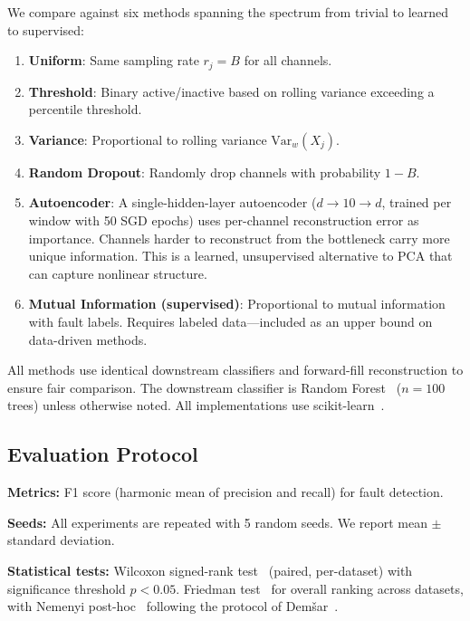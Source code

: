\documentclass[journal]{IEEEtran}
\begin{document}
We compare against six methods spanning the spectrum from trivial to learned to supervised:

\begin{enumerate}[leftmargin=*]
\item \textbf{Uniform}: Same sampling rate $r_j = B$ for all channels.
\item \textbf{Threshold}: Binary active/inactive based on rolling variance exceeding a percentile threshold.
\item \textbf{Variance}: Proportional to rolling variance $\text{Var}_w(X_j)$.
\item \textbf{Random Dropout}: Randomly drop channels with probability $1-B$.
\item \textbf{Autoencoder}: A single-hidden-layer autoencoder ($d \to 10 \to d$, trained per window with 50 SGD epochs) uses per-channel reconstruction error as importance. Channels harder to reconstruct from the bottleneck carry more unique information. This is a learned, unsupervised alternative to PCA that can capture nonlinear structure.
\item \textbf{Mutual Information (supervised)}: Proportional to mutual information with fault labels. Requires labeled data---included as an upper bound on data-driven methods.
\end{enumerate}

All methods use identical downstream classifiers and forward-fill reconstruction to ensure fair comparison. The downstream classifier is Random Forest~\cite{breiman2001random} ($n=100$ trees) unless otherwise noted. All implementations use scikit-learn~\cite{pedregosa2011scikit}.

\subsection{Evaluation Protocol}

\textbf{Metrics:} F1 score (harmonic mean of precision and recall) for fault detection.

\textbf{Seeds:} All experiments are repeated with 5 random seeds. We report mean $\pm$ standard deviation.

\textbf{Statistical tests:} Wilcoxon signed-rank test~\cite{wilcoxon1945individual} (paired, per-dataset) with significance threshold $p < 0.05$. Friedman test~\cite{friedman1937comparison} for overall ranking across datasets, with Nemenyi post-hoc~\cite{nemenyi1963distribution} following the protocol of Dem{\v{s}}ar~\cite{demsar2006statistical}.
\end{document}
